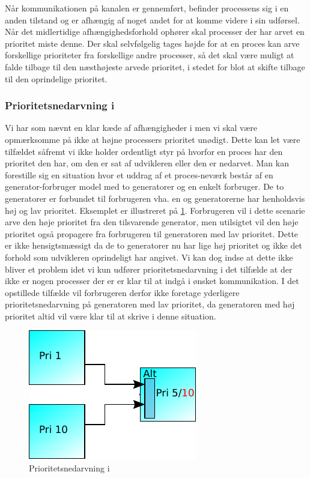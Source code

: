 Når kommunikationen på kanalen er gennemført, befinder processens sig i en anden tilstand og er afhængig af noget andet for at komme videre i sin udførsel. 
Når det midlertidige afhængighedsforhold ophører skal processer der har arvet en prioritet miste denne. Der skal selvfølgelig tages højde for at en proces kan arve forskellige prioriteter fra forskellige andre processer, så det skal være muligt at falde tilbage til den næsthøjeste arvede prioritet, i stedet for blot at skifte tilbage til den oprindelige prioritet. 

\subsubsection*{Prioritetsnedarvning i }
Vi har som nævnt en klar kæde af afhængigheder i \pycsp men vi skal være opmærksomme på ikke at højne processers prioritet unødigt. Dette kan let være tilfældet såfremt vi ikke holder ordentligt styr på hvorfor en proces har den prioritet den har, om den er sat af udvikleren eller den er nedarvet. Man kan forestille sig en situation hvor et uddrag af et proces-neværk består af en generator-forbruger model med to generatorer og en enkelt forbruger. De to generatorer er forbundet til forbrugeren vha. en  og generatorerne har henholdsvis høj og lav prioritet. Eksemplet er illustreret på \cref{fig:alt-inheritance}. Forbrugeren vil i dette scenarie arve den høje prioritet fra den tilsvarende generator, men utilsigtet vil den høje prioritet også propagere fra forbrugeren til generatoren med lav prioritet. Dette er ikke hensigtsmæssigt da de to generatorer nu har lige høj prioritet og ikke det forhold som udvikleren oprindeligt har angivet. Vi kan dog indse at dette ikke bliver et problem idet vi kun udfører prioritetsnedarvning i det tilfælde at der ikke er nogen processer der er er klar til at indgå i ønsket kommunikation. I det opstillede tilfælde vil forbrugeren derfor ikke foretage yderligere prioritetsnedarvning på generatoren med lav prioritet, da generatoren med høj prioritet altid vil være klar til at skrive i denne situation. 

\begin{figure}
 \begin{center}
  \includegraphics[scale=1.00]{images/alt-inheritance}
  \caption{Prioritetsnedarvning i }
  \label{fig:alt-inheritance}
  \end{center}
\end{figure}


